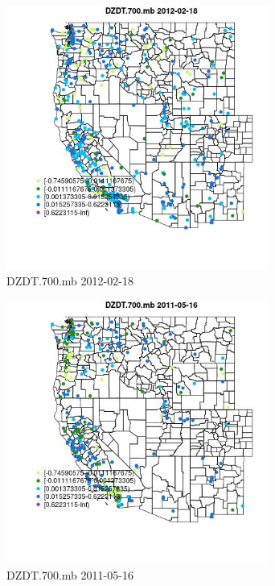 \begin{figure} 
\centering  
\includegraphics[width=0.77\textwidth]{Code_Outputs/Report_ML_input_PM25_Step4_part_f_de_duplicated_aveswNAs_MapObsDZDT700mb2012-02-18.jpg} 
\caption{\label{fig:Report_ML_input_PM25_Step4_part_f_de_duplicated_aveswNAsMapObsDZDT700mb2012-02-18}DZDT.700.mb 2012-02-18} 
\end{figure} 
 

\begin{figure} 
\centering  
\includegraphics[width=0.77\textwidth]{Code_Outputs/Report_ML_input_PM25_Step4_part_f_de_duplicated_aveswNAs_MapObsDZDT700mb2011-05-16.jpg} 
\caption{\label{fig:Report_ML_input_PM25_Step4_part_f_de_duplicated_aveswNAsMapObsDZDT700mb2011-05-16}DZDT.700.mb 2011-05-16} 
\end{figure} 
 

